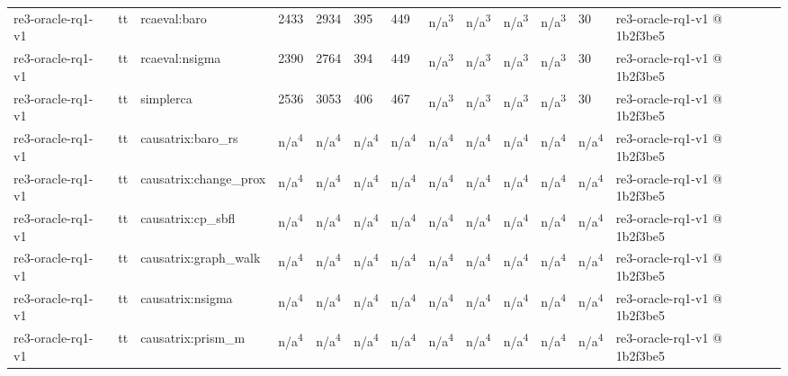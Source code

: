 \begin{table}[t]
\begin{tabular}{lllllllllllll}
re3-oracle-rq1-v1 & tt & rcaeval:baro & 2433 & 2934 & 395 & 449 & n/a\textsuperscript{3} & n/a\textsuperscript{3} & n/a\textsuperscript{3} & n/a\textsuperscript{3} & 30 & re3-oracle-rq1-v1 @ 1b2f3be5 \\
re3-oracle-rq1-v1 & tt & rcaeval:nsigma & 2390 & 2764 & 394 & 449 & n/a\textsuperscript{3} & n/a\textsuperscript{3} & n/a\textsuperscript{3} & n/a\textsuperscript{3} & 30 & re3-oracle-rq1-v1 @ 1b2f3be5 \\
re3-oracle-rq1-v1 & tt & simplerca & 2536 & 3053 & 406 & 467 & n/a\textsuperscript{3} & n/a\textsuperscript{3} & n/a\textsuperscript{3} & n/a\textsuperscript{3} & 30 & re3-oracle-rq1-v1 @ 1b2f3be5 \\
re3-oracle-rq1-v1 & tt & causatrix:baro\_rs & n/a\textsuperscript{4} & n/a\textsuperscript{4} & n/a\textsuperscript{4} & n/a\textsuperscript{4} & n/a\textsuperscript{4} & n/a\textsuperscript{4} & n/a\textsuperscript{4} & n/a\textsuperscript{4} & n/a\textsuperscript{4} & re3-oracle-rq1-v1 @ 1b2f3be5 \\
re3-oracle-rq1-v1 & tt & causatrix:change\_prox & n/a\textsuperscript{4} & n/a\textsuperscript{4} & n/a\textsuperscript{4} & n/a\textsuperscript{4} & n/a\textsuperscript{4} & n/a\textsuperscript{4} & n/a\textsuperscript{4} & n/a\textsuperscript{4} & n/a\textsuperscript{4} & re3-oracle-rq1-v1 @ 1b2f3be5 \\
re3-oracle-rq1-v1 & tt & causatrix:cp\_sbfl & n/a\textsuperscript{4} & n/a\textsuperscript{4} & n/a\textsuperscript{4} & n/a\textsuperscript{4} & n/a\textsuperscript{4} & n/a\textsuperscript{4} & n/a\textsuperscript{4} & n/a\textsuperscript{4} & n/a\textsuperscript{4} & re3-oracle-rq1-v1 @ 1b2f3be5 \\
re3-oracle-rq1-v1 & tt & causatrix:graph\_walk & n/a\textsuperscript{4} & n/a\textsuperscript{4} & n/a\textsuperscript{4} & n/a\textsuperscript{4} & n/a\textsuperscript{4} & n/a\textsuperscript{4} & n/a\textsuperscript{4} & n/a\textsuperscript{4} & n/a\textsuperscript{4} & re3-oracle-rq1-v1 @ 1b2f3be5 \\
re3-oracle-rq1-v1 & tt & causatrix:nsigma & n/a\textsuperscript{4} & n/a\textsuperscript{4} & n/a\textsuperscript{4} & n/a\textsuperscript{4} & n/a\textsuperscript{4} & n/a\textsuperscript{4} & n/a\textsuperscript{4} & n/a\textsuperscript{4} & n/a\textsuperscript{4} & re3-oracle-rq1-v1 @ 1b2f3be5 \\
re3-oracle-rq1-v1 & tt & causatrix:prism\_m & n/a\textsuperscript{4} & n/a\textsuperscript{4} & n/a\textsuperscript{4} & n/a\textsuperscript{4} & n/a\textsuperscript{4} & n/a\textsuperscript{4} & n/a\textsuperscript{4} & n/a\textsuperscript{4} & n/a\textsuperscript{4} & re3-oracle-rq1-v1 @ 1b2f3be5 \\

\end{tabular}
\end{table}
